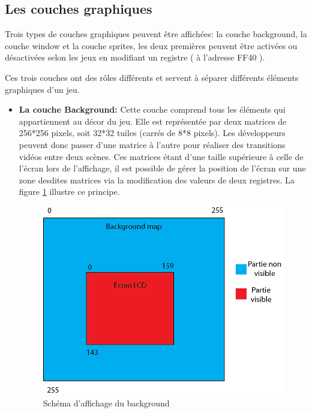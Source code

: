 \documentclass{report}
\begin{document}
\subsection{Les couches graphiques}

Trois types de couches graphiques peuvent être affichées: la couche background, la couche
window et la couche sprites, les deux premières peuvent être activées ou
désactivées selon les jeux en modifiant un registre ( à l'adresse FF40 ).

Ces trois couches ont des rôles différents et servent à séparer différents
éléments graphiques d'un jeu.\\

\begin{itemize}
\item \textbf{La couche Background:}
	Cette couche comprend tous les éléments qui appartiennent au décor du
jeu. Elle est représentée par deux matrices de 256*256 pixels, soit 32*32
tuiles (carrés de 8*8 pixels). Les développeurs peuvent donc passer d'une matrice à
l'autre pour réaliser des transitions vidéos entre deux scènes. Ces matrices étant
d'une taille supérieure à celle de l'écran lors de l'affichage, il est possible de gérer la position de
l'écran sur une zone desdites matrices via la modification des valeurs de
deux registres. La figure \ref{background} illustre ce principe. 
\\

\begin{figure}[!h]
\centering
\includegraphics[scale=0.8]{images/background.png}
\caption{Schéma d'affichage du background}
\label{background}
\end{figure}


\end{itemize}
\end{document}
